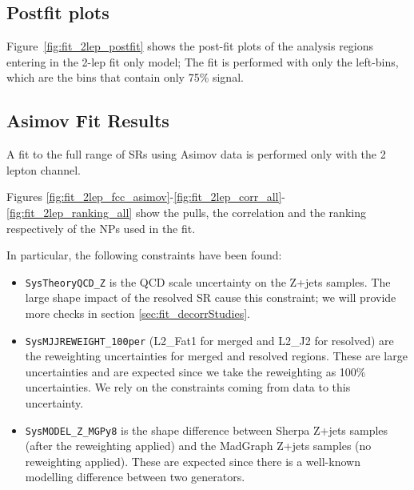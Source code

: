 \subsection{Postfit plots}
Figure~\ref{fig:fit_2lep_postfit} shows the post-fit plots of the analysis regions entering in the 2-lep fit only model;
The fit is performed with only the left-bins, which are the bins that contain only 75\% signal.

\clearpage

\subsection{Asimov Fit Results}
A fit to the full range of SRs using Asimov data is performed only with the 2 lepton channel.

Figures \ref{fig:fit_2lep_fcc_asimov}-\ref{fig:fit_2lep_corr_all}-\ref{fig:fit_2lep_ranking_all}
show the pulls, the correlation and the ranking respectively of the NPs used in the fit.

In particular, the following constraints have been found:
\begin{itemize}
       \item \texttt{SysTheoryQCD\_Z} is the QCD scale uncertainty on the Z+jets samples.
       The large shape impact of the resolved SR cause this constraint;
       we will provide more checks in section \ref{sec:fit_decorrStudies}.

       \item \texttt{SysMJJREWEIGHT\_100per} (L2\_Fat1 for merged and L2\_J2 for resolved)
       are the \mjjtag reweighting uncertainties for merged and resolved regions.
       These are large uncertainties and are expected since we take the \mjjtag reweighting as 100\% uncertainties.
       We rely on the constraints coming from data to this uncertainty.

       \item \texttt{SysMODEL\_Z\_MGPy8}
       is the shape difference between Sherpa Z+jets samples (after the \mjjtag reweighting applied)
       and the MadGraph Z+jets samples (no \mjjtag reweighting applied).
       These are expected since there is a well-known modelling difference between two generators.

\end{itemize}

